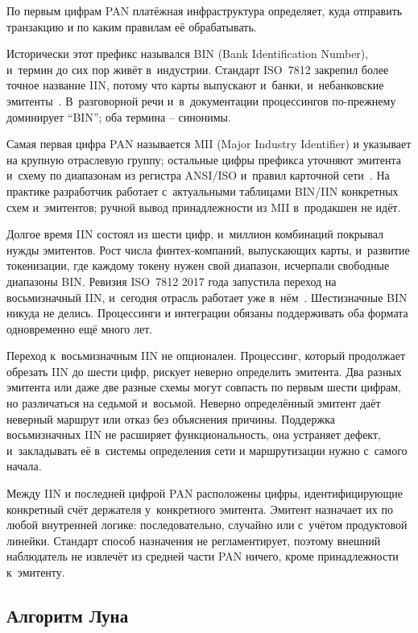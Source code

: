 По первым цифрам PAN платёжная инфраструктура определяет,
куда отправить транзакцию и по каким правилам её обрабатывать.

Исторически этот префикс назывался BIN (Bank Identification
Number), и~термин до сих пор живёт в~индустрии. Стандарт ISO~7812
закрепил более точное название IIN, потому что карты выпускают
и~банки, и~небанковские эмитенты~\cite{iso-7812-transition,ansi-iin}. В~разговорной
речи и~в~документации процессингов по-прежнему доминирует
\enquote{BIN}; оба термина -- синонимы.

Самая первая цифра PAN называется MII (Major Industry Identifier)
и указывает на крупную отраслевую группу; остальные цифры префикса
уточняют эмитента и~схему по диапазонам из регистра ANSI/ISO
и~правил карточной сети~\cite{ansi-iin}. На практике разработчик
работает с~актуальными таблицами BIN/IIN конкретных схем
и~эмитентов; ручной вывод принадлежности из MII в~продакшен не идёт.

Долгое время IIN состоял из шести цифр, и~миллион комбинаций
покрывал нужды эмитентов. Рост числа финтех-компаний, выпускающих
карты, и~развитие токенизации, где каждому токену нужен свой
диапазон, исчерпали свободные диапазоны BIN. Ревизия ISO~7812
2017 года запустила переход на восьмизначный IIN, и~сегодня
отрасль работает уже в~нём~\cite{iso-7812-transition,ansi-iin}.
Шестизначные BIN никуда не делись. Процессинги и интеграции
обязаны поддерживать оба формата одновременно ещё много лет.

Переход к~восьмизначным IIN не опционален. Процессинг, который
продолжает обрезать IIN до шести цифр, рискует неверно определить
эмитента. Два разных эмитента или даже две разные схемы могут
совпасть по первым шести цифрам, но различаться на седьмой
и~восьмой. Неверно определённый эмитент даёт неверный маршрут
или отказ без объяснения причины. Поддержка восьмизначных
IIN не расширяет функциональность, она устраняет дефект, и~закладывать
её в~системы определения сети и маршрутизации нужно с~самого начала.

Между IIN и последней цифрой PAN расположены цифры, идентифицирующие
конкретный счёт держателя у~конкретного эмитента. Эмитент назначает
их по любой внутренней логике: последовательно, случайно или
с~учётом продуктовой линейки. Стандарт способ назначения
не регламентирует, поэтому внешний наблюдатель не извлечёт из
средней части PAN ничего, кроме принадлежности к~эмитенту.
\subsection*{Алгоритм Луна}

